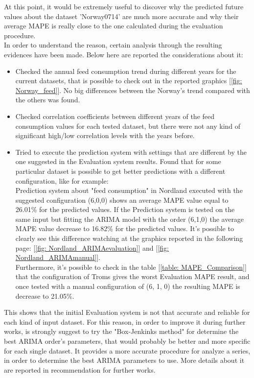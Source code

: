 At this point, it would be extremely useful to discover why the predicted future values about the dataset 'Norway0714' are much more accurate and why their average MAPE is really close to the one calculated during the evaluation procedure.\\
In order to understand the reason, certain analysis through the resulting evidences have been made. Below here are reported the considerations about it:
\vspace{-5mm}
\begin{itemize}
 \item Checked the annual feed consumption trend during different years for the current datasets, that is possible to check out in the reported graphics [\ref{fig: Norway_feed}]. No big differences between the Norway's trend compared with the others was found.
 \item Checked correlation coefficients between different years of the feed consumption values for each tested dataset, but there were not any kind of significant high/low correlation levels with the years before.
 \item Tried to execute the prediction system with settings that are different by the one suggested in the Evaluation system results. Found that for some particular dataset is possible to get better predictions with a different configuration, like for example: \\
 Prediction system about "feed consumption" in Nordland executed with the suggested configuration (6,0,0) shows an average MAPE value equal to 26.01\% for the predicted values. If the Prediction system is tested on the same input but fitting the ARIMA model with the order (6,1,0) the average MAPE value decrease to 16.82\% for the predicted values. It's possible to clearly see this difference watching at the graphics reported in the following page: [\ref{fig: Nordland_ARIMAevaluation}] and [\ref{fig: Nordland_ARIMAmanual}]. \\ 
Furthermore, it's possible to check in the table [\ref{table: MAPE_Comparison}] that the configuration of Troms gives the worst Evaluation MAPE result, and once tested with a manual configuration of (6, 1, 0) the resulting MAPE is decrease to 21.05\%.
\end{itemize}

This shows that the initial Evaluation system is not that accurate and reliable for each kind of input dataset. For this reason, in order to improve it during further works, is strongly suggest to try the "Box-Jenkinks method" for determine the best ARIMA order's parameters, that would probably be better and more specific for each single dataset. It provides a more accurate procedure for analyze a series, in order to determine the best ARIMA parameters to use. More details about it are reported in recommendation for further works.



